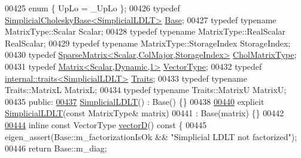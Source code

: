\begin{DoxyCode}
00425     \textcolor{keyword}{enum} \{ UpLo = \_UpLo \};
00426     \textcolor{keyword}{typedef} \hyperlink{group___sparse_cholesky___module_class_eigen_1_1_simplicial_cholesky_base}{SimplicialCholeskyBase<SimplicialLDLT>} 
      \hyperlink{group___sparse_cholesky___module_class_eigen_1_1_simplicial_cholesky_base}{Base};
00427     \textcolor{keyword}{typedef} \textcolor{keyword}{typename} MatrixType::Scalar Scalar;
00428     \textcolor{keyword}{typedef} \textcolor{keyword}{typename} MatrixType::RealScalar RealScalar;
00429     \textcolor{keyword}{typedef} \textcolor{keyword}{typename} MatrixType::StorageIndex StorageIndex;
00430     \textcolor{keyword}{typedef} \hyperlink{group___sparse_core___module}{SparseMatrix<Scalar,ColMajor,StorageIndex>} 
      \hyperlink{group___sparse_core___module_class_eigen_1_1_sparse_matrix}{CholMatrixType};
00431     \textcolor{keyword}{typedef} \hyperlink{group___core___module}{Matrix<Scalar,Dynamic,1>} \hyperlink{group___core___module}{VectorType};
00432     \textcolor{keyword}{typedef} \hyperlink{struct_eigen_1_1internal_1_1traits}{internal::traits<SimplicialLDLT>} 
      \hyperlink{struct_eigen_1_1internal_1_1traits}{Traits};
00433     \textcolor{keyword}{typedef} \textcolor{keyword}{typename} Traits::MatrixL  MatrixL;
00434     \textcolor{keyword}{typedef} \textcolor{keyword}{typename} Traits::MatrixU  MatrixU;
00435 \textcolor{keyword}{public}:
\hyperlink{group___sparse_cholesky___module_a3f26ae6105ffa36af9b8710e01e5caed}{00437}     \hyperlink{group___sparse_cholesky___module_a3f26ae6105ffa36af9b8710e01e5caed}{SimplicialLDLT}() : Base() \{\}
00438 
\hyperlink{group___sparse_cholesky___module_a07cb76aee396862f94c3eedc6d77d908}{00440}     \textcolor{keyword}{explicit} \hyperlink{group___sparse_cholesky___module_a07cb76aee396862f94c3eedc6d77d908}{SimplicialLDLT}(\textcolor{keyword}{const} MatrixType& matrix)
00441         : Base(matrix) \{\}
00442 
\hyperlink{group___sparse_cholesky___module_abe54532ce80558a0474b11763702107b}{00444}     \textcolor{keyword}{inline} \textcolor{keyword}{const} VectorType \hyperlink{group___sparse_cholesky___module_abe54532ce80558a0474b11763702107b}{vectorD}()\textcolor{keyword}{ const }\{
00445         eigen\_assert(Base::m\_factorizationIsOk && \textcolor{stringliteral}{"Simplicial LDLT not factorized"});
00446         \textcolor{keywordflow}{return} Base::m\_diag;

\end{DoxyCode}
